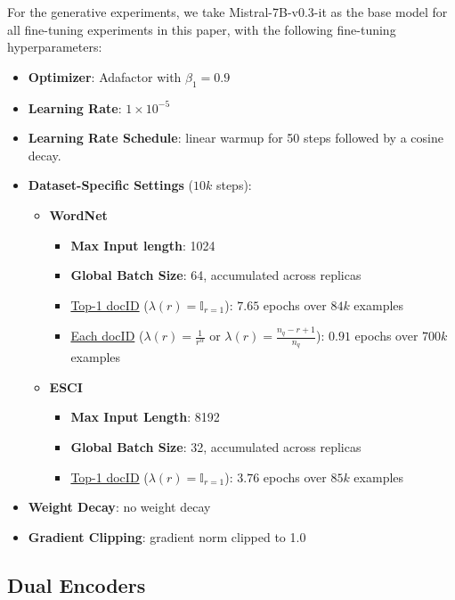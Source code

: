 \documentclass[11pt, a4paper, onecolumn, confidential, copyright, gdm]{google}
\begin{document}
For the generative experiments, we take Mistral-7B-v0.3-it \citep{jiang2024identifying} as the base model for all fine-tuning experiments in this paper, with the following fine-tuning hyperparameters:
\begin{itemize}
    \item \textbf{Optimizer}: Adafactor \citep{shazeer2018adafactor} with $\beta_1=0.9$
    \item \textbf{Learning Rate}: $1 \times 10^{-5}$
    \item \textbf{Learning Rate Schedule}: linear warmup for 50 steps followed by a cosine decay.
    \item \textbf{Dataset-Specific Settings} ($10k$ steps):
    \begin{itemize}
        \item \textbf{WordNet}
        \begin{itemize}
            \item \textbf{Max Input length}: 1024
            \item \textbf{Global Batch Size}: 64, accumulated across replicas
            \item \underline{Top-1 docID} ($\lambda(r)=\mathbb{I}_{r=1}$): $7.65$ epochs over $84k$ examples
            \item \underline{Each docID} ($\lambda(r)=\frac{1}{r^\alpha}$ or $\lambda(r)=\frac{n_q - r + 1}{n_q}$): $0.91$ epochs over $700k$ examples
        \end{itemize}
        \item \textbf{ESCI}
        \begin{itemize}
            \item \textbf{Max Input Length}: 8192
            \item \textbf{Global Batch Size}: 32, accumulated across replicas
            \item \underline{Top-1 docID} ($\lambda(r)=\mathbb{I}_{r=1}$): $3.76$ epochs over $85k$ examples
        \end{itemize}
    \end{itemize}
    \item \textbf{Weight Decay}: no weight decay
    \item \textbf{Gradient Clipping}: gradient norm clipped to 1.0
\end{itemize}

\subsection{Dual Encoders}\label{sec:hparams-de}
\end{document}
